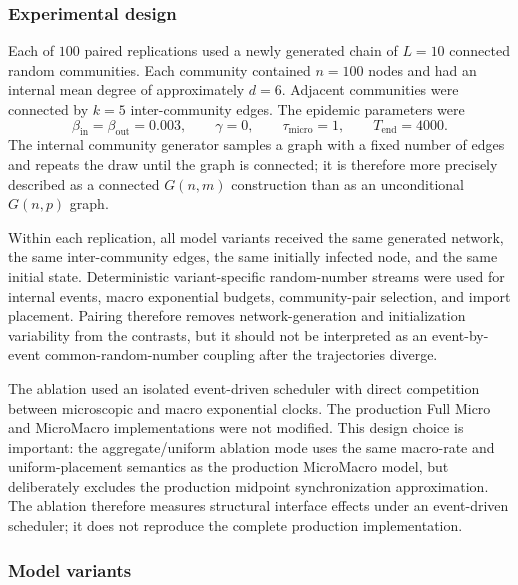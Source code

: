 \subsubsection{Experimental design}
\label{sec:hazard_placement_design}

Each of $100$ paired replications used a newly generated chain of $L=10$ connected random communities.  Each community contained $n=100$ nodes and had an internal mean degree of approximately $d=6$.  Adjacent communities were connected by $k=5$ inter-community edges.  The epidemic parameters were
\[
\beta_{\mathrm{in}}=\beta_{\mathrm{out}}=0.003,
\qquad
\gamma=0,
\qquad
\tau_{\mathrm{micro}}=1,
\qquad
T_{\mathrm{end}}=4000.
\]
The internal community generator samples a graph with a fixed number of edges and repeats the draw until the graph is connected; it is therefore more precisely described as a connected $G(n,m)$ construction than as an unconditional $G(n,p)$ graph.

Within each replication, all model variants received the same generated network, the same inter-community edges, the same initially infected node, and the same initial state.  Deterministic variant-specific random-number streams were used for internal events, macro exponential budgets, community-pair selection, and import placement.  Pairing therefore removes network-generation and initialization variability from the contrasts, but it should not be interpreted as an event-by-event common-random-number coupling after the trajectories diverge.

The ablation used an isolated event-driven scheduler with direct competition between microscopic and macro exponential clocks.  The production Full Micro and MicroMacro implementations were not modified.  This design choice is important: the aggregate/uniform ablation mode uses the same macro-rate and uniform-placement semantics as the production MicroMacro model, but deliberately excludes the production midpoint synchronization approximation.  The ablation therefore measures structural interface effects under an event-driven scheduler; it does not reproduce the complete production implementation.

\subsubsection{Model variants}
\label{sec:hazard_placement_modes}

